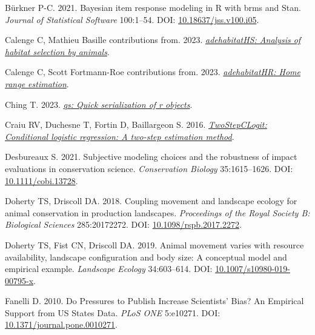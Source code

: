 \documentclass[10pt,a4paper]{article}
\newlength{\cslhangindent}
\newlength{\cslentryspacingunit} %
\newenvironment{CSLReferences}[2] %
 {%
  \setlength{\parindent}{0pt}
  \ifodd #1
  \let\oldpar\par
  \def\par{\hangindent=\cslhangindent\oldpar}
  \fi
  \setlength{\parskip}{#2\cslentryspacingunit}
 }%
 {}
\begin{document}
\begin{CSLReferences}{1}{0}
\leavevmode{}%
Bürkner P-C. 2021. Bayesian item response modeling in {R} with {brms} and {Stan}. \emph{Journal of Statistical Software} 100:1--54. DOI: \href{https://doi.org/10.18637/jss.v100.i05}{10.18637/jss.v100.i05}.

\leavevmode{}%
Calenge C, Mathieu Basille contributions from. 2023. \emph{\href{https://CRAN.R-project.org/package=adehabitatHS}{{adehabitatHS}: Analysis of habitat selection by animals}}.

\leavevmode{}%
Calenge C, Scott Fortmann-Roe contributions from. 2023. \emph{\href{https://CRAN.R-project.org/package=adehabitatHR}{{adehabitatHR}: Home range estimation}}.

\leavevmode{}%
Ching T. 2023. \emph{\href{https://CRAN.R-project.org/package=qs}{{qs}: Quick serialization of r objects}}.

\leavevmode{}%
Craiu RV, Duchesne T, Fortin D, Baillargeon S. 2016. \emph{\href{https://CRAN.R-project.org/package=TwoStepCLogit}{TwoStepCLogit: Conditional logistic regression: A two-step estimation method}}.

\leavevmode{}%
Desbureaux S. 2021. Subjective modeling choices and the robustness of impact evaluations in conservation science. \emph{Conservation Biology} 35:1615--1626. DOI: \href{https://doi.org/10.1111/cobi.13728}{10.1111/cobi.13728}.

\leavevmode{}%
Doherty TS, Driscoll DA. 2018. Coupling movement and landscape ecology for animal conservation in production landscapes. \emph{Proceedings of the Royal Society B: Biological Sciences} 285:20172272. DOI: \href{https://doi.org/10.1098/rspb.2017.2272}{10.1098/rspb.2017.2272}.

\leavevmode{}%
Doherty TS, Fist CN, Driscoll DA. 2019. Animal movement varies with resource availability, landscape configuration and body size: A conceptual model and empirical example. \emph{Landscape Ecology} 34:603--614. DOI: \href{https://doi.org/10.1007/s10980-019-00795-x}{10.1007/s10980-019-00795-x}.

\leavevmode{}%
Fanelli D. 2010. Do {Pressures} to {Publish} {Increase} {Scientists}' {Bias}? {An} {Empirical} {Support} from {US} {States} {Data}. \emph{PLoS ONE} 5:e10271. DOI: \href{https://doi.org/10.1371/journal.pone.0010271}{10.1371/journal.pone.0010271}.


\end{CSLReferences}
\end{document}
